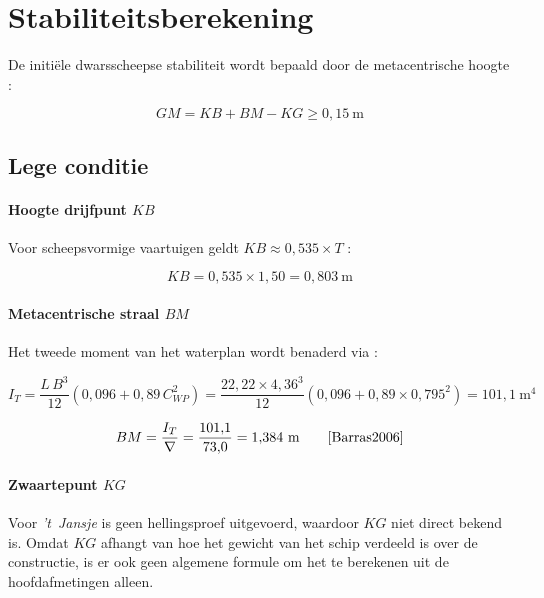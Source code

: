 \section{Stabiliteitsberekening}
\label{sec:stab_berekening}

De initiële dwarsscheepse stabiliteit wordt bepaald door de metacentrische
hoogte \cite[p.~44]{Barras2006}:

\begin{equation}
    GM = KB + BM - KG \geq 0{,}15\ \mathrm{m}
    \label{eq:GM}
\end{equation}

\subsection{Lege conditie}

\paragraph{Hoogte drijfpunt $KB$}
Voor scheepsvormige vaartuigen geldt $KB \approx 0{,}535 \times T$
\cite[p.~104]{Barras2006}:

\begin{equation}
    KB = 0{,}535 \times 1{,}50 = 0{,}803\ \mathrm{m}
\end{equation}

\paragraph{Metacentrische straal $BM$}
Het tweede moment van het waterplan wordt benaderd via
\cite[Hfst.~1]{Schneekluth1998}:

\begin{equation}
    I_T = \frac{L\,B^3}{12}\!\left(0{,}096 + 0{,}89\,C_{WP}^2\right)
        = \frac{22{,}22 \times 4{,}36^3}{12}
          \!\left(0{,}096 + 0{,}89 \times 0{,}795^2\right)
        = 101{,}1\ \mathrm{m^4}
\end{equation}

\begin{equation}
    BM = \frac{I_T}{\nabla} = \frac{101{,}1}{73{,}0} = 1{,}384\ \mathrm{m}
    \qquad \cite[p.~107]{Barras2006}
\end{equation}

\paragraph{Zwaartepunt $KG$}
Voor \emph{'t~Jansje} is geen hellingsproef  uitgevoerd, waardoor $KG$ niet
direct bekend is. Omdat $KG$ afhangt van hoe het gewicht van het schip
verdeeld is over de constructie, is er ook geen algemene formule om het te
berekenen uit de hoofdafmetingen alleen.

